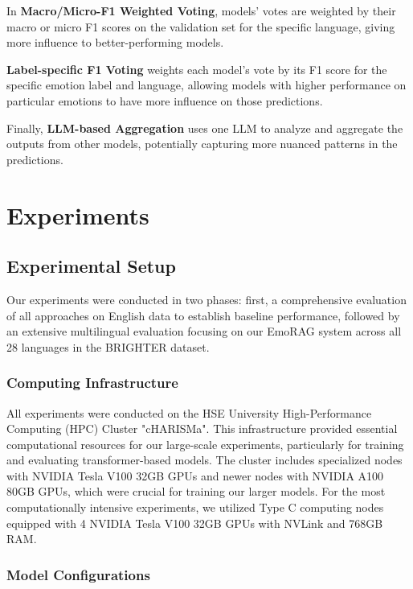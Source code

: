 \documentclass[a4paper,12pt]{extarticle}
\begin{document}
In \textbf{Macro/Micro-F1 Weighted Voting}, models' votes are weighted by their macro or micro F1 scores on the validation set for the specific language, giving more influence to better-performing models. 

\textbf{Label-specific F1 Voting} weights each model's vote by its F1 score for the specific emotion label and language, allowing models with higher performance on particular emotions to have more influence on those predictions. 

Finally, \textbf{LLM-based Aggregation} uses one LLM to analyze and aggregate the outputs from other models, potentially capturing more nuanced patterns in the predictions.

\section{Experiments}

\subsection{Experimental Setup}

Our experiments were conducted in two phases: first, a comprehensive evaluation of all approaches on English data to establish baseline performance, followed by an extensive multilingual evaluation focusing on our EmoRAG system across all 28 languages in the BRIGHTER dataset.

\subsubsection{Computing Infrastructure}

All experiments were conducted on the HSE University High-Performance Computing (HPC) Cluster "cHARISMa". This infrastructure provided essential computational resources for our large-scale experiments, particularly for training and evaluating transformer-based models. The cluster includes specialized nodes with NVIDIA Tesla V100 32GB GPUs and newer nodes with NVIDIA A100 80GB GPUs, which were crucial for training our larger models. For the most computationally intensive experiments, we utilized Type C computing nodes equipped with 4 NVIDIA Tesla V100 32GB GPUs with NVLink and 768GB RAM.

\subsubsection{Model Configurations}
\end{document}
